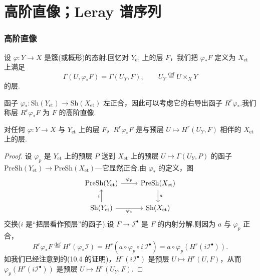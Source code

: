 ﻿%
\chapter{高阶直像；Leray 谱序列}\label{sec:12}

\subsection*{高阶直像}

设 $\varphi \colon Y \to X$ 是簇(或概形)的态射.回忆对 $Y_{\mathrm{et}}$ 上的层 $F$，我们把 $\varphi_{*}F$ 定义为 $X_{\mathrm{et}}$ 上满足
\[
\Gamma(U, \varphi_{*}F) = \Gamma(U_Y, F), \qquad U_Y \overset{\mathrm{def}}{=} U \times_{X} Y
\]
的层.

函子 $\varphi_{*} \colon \mathrm{Sh}(Y_{\mathrm{et}}) \to \mathrm{Sh}(X_{\mathrm{et}})$ 左正合，因此可以考虑它的右导出函子 $R^{r}\varphi_{*}$.我们称层 $R^{r}\varphi_{*}F$ 为 $F$ 的高阶直像.

\begin{proposition}\label{prop:12.1}
对任何 $\varphi \colon Y \to X$ 与 $Y_{\mathrm{et}}$ 上的层 $F$，$R^{r}\varphi_{*}F$ 是与预层 $U \mapsto H^{r}(U_Y, F)$ 相伴的 $X_{\mathrm{et}}$ 上的层.
\end{proposition}

\begin{proof}
设 $\varphi_{p}$ 是 $Y_{\mathrm{et}}$ 上的预层 $P$ 送到 $X_{\mathrm{et}}$ 上的预层 $U \mapsto \Gamma(U_Y, P)$ 的函子 $\mathrm{PreSh}(Y_{\mathrm{et}}) \to \mathrm{PreSh}(X_{\mathrm{et}})$---它显然正合.由 $\varphi_{*}$ 的定义，图
\[
\begin{tikzcd}
\mathrm{PreSh}(Y_{\mathrm{et}}) \arrow[r, "\varphi_{p}"] & \mathrm{PreSh}(X_{\mathrm{et}}) \arrow[d, "a"] \\
\mathrm{Sh}(Y_{\mathrm{et}}) \arrow[u, "i"] \arrow[r, "\varphi_{*}"'] & \mathrm{Sh}(X_{\mathrm{et}})
\end{tikzcd}
\]
交换($i$ 是``把层看作预层''的函子).设 $F \to \mathcal{I}^{\bullet}$ 是 $F$ 的内射分解.则因为 $a$ 与 $\varphi_{p}$ 正合，
\[
R^{r}\varphi_{*}F \overset{\mathrm{def}}{=} H^{r}(\varphi_{*}\mathcal{I}) = H^{r}(a \circ \varphi_{p} \circ i \, \mathcal{I}^{\bullet}) = a \circ \varphi_{p}(H^{r}(i\mathcal{I}^{\bullet})).
\]
如我们已经注意到的(10.4 的证明)，$H^{r}(i\mathcal{I}^{\bullet})$ 是预层 $U \mapsto H^{r}(U, F)$，从而 $\varphi_{p}(H^{r}(i\mathcal{I}^{\bullet}))$ 是预层 $U \mapsto H^{r}(U_Y, F)$.
\end{proof}

